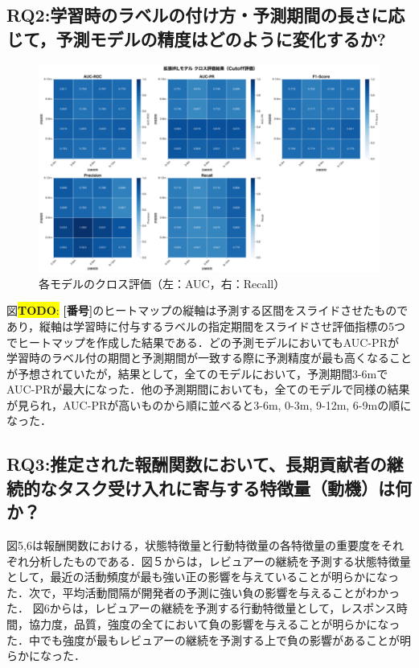 \documentclass[submit,techrep,noauthor]{ipsj}
\newcommand{\todo}[1]{\colorbox{yellow}{{\bf TODO}:}{\color{red} {\textbf{[#1]}}}}
\begin{document}
\subsection{RQ2:学習時のラベルの付け方・予測期間の長さに応じて，予測モデルの精度はどのように変化するか?}
\begin{figure}[t]
    \centering
\includegraphics[width=1.0\textwidth]{./Hashimoto_fig/heatmap.pdf}
    \caption{各モデルのクロス評価（左：AUC，右：Recall）}
    \label{fig:Approach}
\end{figure}
図\todo{番号}のヒートマップの縦軸は予測する区間をスライドさせたものであり，縦軸は学習時に付与するラベルの指定期間をスライドさせ評価指標の5つでヒートマップを作成した結果である．どの予測モデルにおいてもAUC-PRが
学習時のラベル付の期間と予測期間が一致する際に予測精度が最も高くなることが予想されていたが，結果として，全てのモデルにおいて，予測期間3-6mでAUC-PRが最大になった．他の予測期間においても，全てのモデルで同様の結果が見られ，AUC-PRが高いものから順に並べると3-6m, 0-3m, 9-12m, 6-9mの順になった．


\subsection{RQ3:推定された報酬関数において、長期貢献者の継続的なタスク受け入れに寄与する特徴量（動機）は何か？}
図5,6は報酬関数における，状態特徴量と行動特徴量の各特徴量の重要度をそれぞれ分析したものである．図５からは，レビュアーの継続を予測する状態特徴量として，最近の活動頻度が最も強い正の影響を与えていることが明らかになった．次で，平均活動間隔が開発者の予測に強い負の影響を与えることがわかった．
図6からは，レビュアーの継続を予測する行動特徴量として，レスポンス時間，協力度，品質，強度の全てにおいて負の影響を与えることが明らかになった．中でも強度が最もレビュアーの継続を予測する上で負の影響があることが明らかになった．
\end{document}
